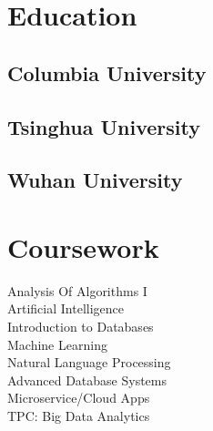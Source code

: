 \documentclass[]{junhu_resume}
\begin{document}
\begin{minipage}[t]{0.33\textwidth} 


\section{Education} 

\subsection{Columbia University}
\sectionsep

\subsection{Tsinghua University}
\sectionsep

\subsection{Wuhan University}
\sectionsep




\section{Coursework}
Analysis Of Algorithms I\\
Artificial Intelligence\\
Introduction to Databases\\
Machine Learning\\
Natural Language Processing\\
Advanced Database Systems\\
Microservice/Cloud Apps\\
TPC: Big Data Analytics
\sectionsep


\end{minipage}
\end{document}
